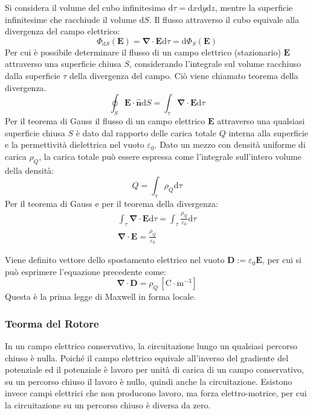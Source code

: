 \documentclass{article}
\newcommand{\vect}[1]{\boldsymbol{\mathbf{#1}}}
\newcommand{\df}{\mathrm{d}}
\newcommand{\SI}[1]{\mathrm{#1}}
\numberwithin{equation}{subsection}
\begin{document}
Si considera il volume del cubo infinitesimo $\df\tau=\df x\df y\df z$, mentre la superficie infinitesime che racchiude il volume $\df S$. Il flusso attraverso il cubo equivale alla 
divergenza del campo elettrico: 
\begin{equation*}
    \Phi_{\df S}(\vect{E})={\vect\nabla}\cdot\vect{E}\df\tau=\df\Phi_S(\vect{E})
\end{equation*}
Per cui è possibile determinare il flusso di un campo elettrico (stazionario) $\vect{E}$ attraverso una superficie chiusa $S$, considerando l'integrale sul volume 
racchiuso dalla superficie $\tau$ della divergenza del campo. Ciò viene chiamato teorema della divergenza. 
\begin{equation}
    \displaystyle\oint_S\vect{E}\cdot\hat{\vect{n}}\df S=\int_{\tau}{\vect\nabla}\cdot\vect{E}\df\tau
\end{equation} 
Per il teorema di Gauss il flusso di un campo elettrico $\vect{E}$ attraverso una qualsiasi superficie chiusa $S$ è dato dal rapporto delle carica totale $Q$ interna alla superficie 
e la permettività dielettrica nel vuoto $\varepsilon_0$. Dato un mezzo con densità uniforme di carica $\rho_Q$, la carica totale può essere espressa come l'integrale sull'intero 
volume della densità: 
\begin{equation*}
    Q=\displaystyle\int_{\tau}\rho_Q\df\tau
\end{equation*}  
Per il teorema di Gauss e per il teorema della divergenza:
\begin{gather*}
    \displaystyle\int_{\tau}{\vect\nabla}\cdot \vect{E}\df\tau=\int_{\tau}\frac{\rho_Q}{\varepsilon_0}\df\tau\\
    {\vect\nabla}\cdot\vect{E}=\displaystyle\frac{\rho_Q}{\varepsilon_0}
\end{gather*}

Viene definito vettore dello spostamento elettrico nel vuoto $\vect{D}:=\varepsilon_0\vect{E}$, per cui si può esprimere l'equazione precedente come:
\begin{equation}
    {\vect\nabla}\cdot\vect{D}=\rho_Q\,\displaystyle\left[{\SI{C}}\cdot{\SI{m}^{-3}}\right]
\end{equation}
Questa è la prima legge di Maxwell in forma locale. 

\subsubsection{Teorma del Rotore}

In un campo elettrico conservativo, la circuitazione lungo un qualsiasi percorso chiuso è nulla. Poiché il campo elettrico equivale all'inverso del gradiente del 
potenziale ed il potenziale è lavoro per unità di carica di un campo conservativo, su un percorso chiuso il lavoro è nullo, quindi anche la circuitazione. Esistono invece 
campi elettrici che non producono lavoro, ma forza elettro-motrice, per cui la circuitazione su un percorso chiuso è diversa da zero. 
\end{document}
